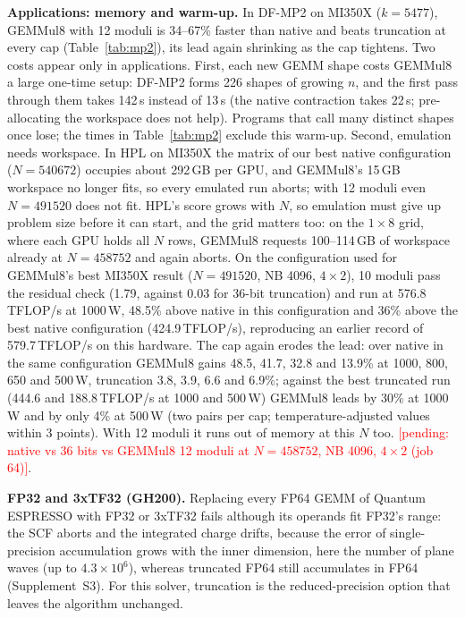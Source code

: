\documentclass[conference]{IEEEtran}
\newcommand{\W}{\,W}
\newcommand{\pct}{\%}
\newcommand{\pending}[1]{\textcolor{red}{[pending: #1]}}
\begin{document}
\textbf{Applications: memory and warm-up.} In DF-MP2 on MI350X ($k=5477$), GEMMul8 with 12 moduli is 34--67\pct{}
faster than native and beats truncation at every cap (Table~\ref{tab:mp2}), its lead again shrinking as the cap tightens.
Two costs appear only in applications. First, each new GEMM shape costs GEMMul8 a large one-time setup: DF-MP2 forms
226 shapes of growing $n$, and the first pass through them takes 142\,s instead of 13\,s (the native contraction takes
22\,s; pre-allocating the workspace does not help). Programs that call many distinct shapes once lose; the times in
Table~\ref{tab:mp2} exclude this warm-up. Second, emulation needs workspace. In HPL on MI350X the matrix of our best
native configuration ($N=540672$) occupies about 292\,GB per GPU, and GEMMul8's 15\,GB workspace no longer fits, so every
emulated run aborts; with 12 moduli even $N=491520$ does not fit. HPL's score grows with $N$, so emulation must give
up problem size before it can start, and the grid matters too: on the $1\times8$ grid, where each GPU holds all $N$ rows,
GEMMul8 requests 100--114\,GB of workspace already at $N=458752$ and again aborts. On the configuration used for GEMMul8's best MI350X result ($N=491520$, NB 4096,
$4\times2$), 10 moduli pass the residual check (1.79, against 0.03 for 36-bit truncation) and run at 576.8\,TFLOP/s at
1000\W, 48.5\pct{} above native in this configuration and 36\pct{} above the best native configuration (424.9\,TFLOP/s),
reproducing an earlier record of 579.7\,TFLOP/s on this hardware. The cap again erodes the lead: over native in the same
configuration GEMMul8 gains 48.5, 41.7, 32.8 and 13.9\pct{} at 1000, 800, 650 and 500\W, truncation 3.8, 3.9, 6.6 and
6.9\pct; against the best truncated run (444.6 and 188.8\,TFLOP/s at 1000 and 500\W) GEMMul8 leads by 30\pct{} at
1000\W{} and by only 4\pct{} at 500\W{} (two pairs per cap; temperature-adjusted values within 3 points). With 12 moduli
it runs out of memory at this $N$ too. \pending{native vs 36 bits vs GEMMul8 12 moduli at $N=458752$, NB 4096,
$4\times2$ (job 64)}.

\textbf{FP32 and 3xTF32 (GH200).} Replacing every FP64 GEMM of Quantum ESPRESSO with FP32 or 3xTF32 fails although
its operands fit FP32's range: the SCF aborts and the integrated charge drifts, because the error of single-precision
accumulation grows with the inner dimension, here the number of plane waves (up to $4.3{\times}10^6$), whereas truncated FP64
still accumulates in FP64 (Supplement~S3). For this solver, truncation is the reduced-precision option that leaves the
algorithm unchanged.
\end{document}
